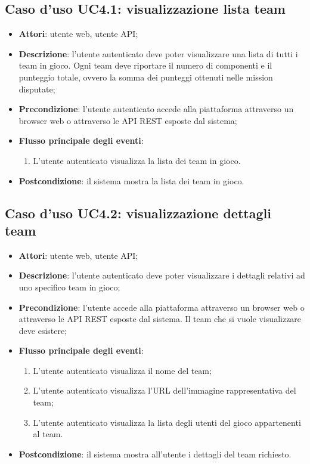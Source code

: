\subsection{Caso d'uso UC4.1: visualizzazione lista team}
\begin{itemize}
\item \textbf{Attori}: utente web, utente API;
\item \textbf{Descrizione}: l'utente autenticato deve poter visualizzare una lista di tutti i team in gioco. Ogni team deve riportare il numero di componenti e il punteggio totale, ovvero la somma dei punteggi ottenuti nelle mission disputate; 
      \item \textbf{Precondizione}: l'utente autenticato accede alla piattaforma attraverso un browser web o attraverso le API REST esposte dal sistema;

        \item \textbf{Flusso principale degli eventi}:
          \begin{enumerate}
          \item L'utente autenticato visualizza la lista dei team in gioco.

      \end{enumerate}
    \item \textbf{Postcondizione}: il sistema mostra la lista dei team in gioco.
  \end{itemize}
\hypertarget{UC4.2}{}
\subsection{Caso d'uso UC4.2: visualizzazione dettagli team}
\begin{itemize}
\item \textbf{Attori}: utente web, utente API;
\item \textbf{Descrizione}: l'utente autenticato deve poter visualizzare i dettagli relativi ad uno specifico team in gioco; 
      \item \textbf{Precondizione}: l'utente accede alla piattaforma attraverso un browser web o attraverso le API REST esposte dal sistema. Il team che si vuole visualizzare deve esistere;

        \item \textbf{Flusso principale degli eventi}:
          \begin{enumerate}
          \item L'utente autenticato visualizza il nome del team;
          \item L'utente autenticato visualizza l'URL dell'immagine rappresentativa del team;
          \item L'utente autenticato visualizza la lista degli utenti del gioco appartenenti al team.

      \end{enumerate}
    \item \textbf{Postcondizione}: il sistema mostra all'utente i dettagli del team richiesto.
  \end{itemize}
\hypertarget{UC4.3}{}
